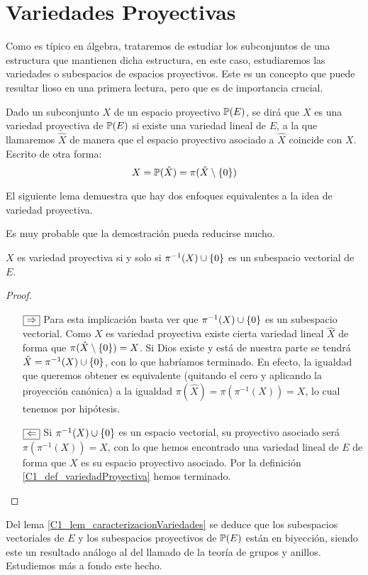 \section{Variedades Proyectivas}
\label{C1_variedadesProyectivas}
Como es típico en álgebra, trataremos de estudiar los subconjuntos de una estructura que mantienen dicha estructura, en este caso, estudiaremos las variedades o subespacios de espacios proyectivos. Este es un concepto que puede resultar lioso en una primera lectura, pero que es de importancia crucial.
\begin{defi}
	\label{C1_def_variedadProyectiva}
	Dado un subconjunto $X$ de un espacio proyectivo $\mathbb{P}(E)$, se dirá que $X$ es una variedad proyectiva de $\mathbb{P}(E)$ si existe una variedad lineal de $E$, a la que llamaremos $\hat{X}$ de manera que el espacio proyectivo asociado a $\hat{X}$ coincide con $X$. Escrito de otra forma:
	\[
		X=\mathbb{P}(\hat{X})=\pi(\hat{X}\setminus\{0\})
	\]
\end{defi}

El siguiente lema demuestra que hay dos enfoques equivalentes a la idea de variedad proyectiva.

Es muy probable que la demostración pueda reducirse mucho.
\begin{lem}
	\label{C1_lem_caracterizacionVariedades}
	$X$ es variedad proyectiva si y solo si $\pi^{-1}(X)\cup\{0\}$ es un subespacio vectorial de $E$.
\end{lem}
\begin{proof}
\begin{itemize}
	\item[$\fbox{$\Rightarrow$}$] Para esta implicación basta ver que $\pi^{-1}(X)\cup\{0\}$ es un subespacio vectorial. Como $X$ es variedad proyectiva existe cierta variedad lineal $\hat{X}$ de forma que $\pi(\hat{X}\setminus\{0\})=X$. Si Dios existe y está de nuestra parte se tendrá  $\hat{X}=\pi^{-1}(X)\cup\{0\}$, con lo que habríamos terminado. En efecto, la igualdad que queremos obtener es equivalente (quitando el cero y aplicando la proyección canónica) a la igualdad $\pi(\hat{X})=\pi(\pi^{-1}(X))=X$, lo cual tenemos por hipótesis.
	\item[$\fbox{$\Leftarrow$}$] Si $\pi^{-1}(X)\cup\{0\}$ es un espacio vectorial, su proyectivo asociado será $\pi(\pi^{-1}(X))=X$, con lo que hemos encontrado una variedad lineal de $E$ de forma que $X$ es su espacio proyectivo asociado. Por la definición \ref{C1_def_variedadProyectiva} hemos terminado.
\end{itemize}
\end{proof}
Del lema \ref{C1_lem_caracterizacionVariedades} se deduce que los subespacios vectoriales de $E$ y los subespacios proyectivos de $\mathbb{P}(E)$ están en biyección, siendo este un resultado análogo al del llamado  de la teoría de grupos y anillos. Estudiemos más a fondo este hecho.

